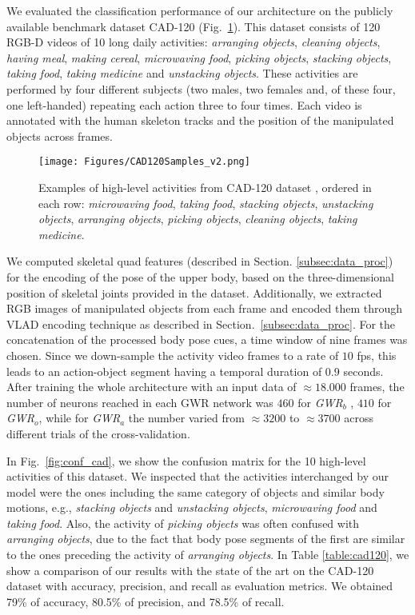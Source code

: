 \documentclass[5p,times]{elsarticle}
\begin{document}
We evaluated the classification performance of our architecture on the publicly available benchmark dataset CAD-120 (Fig.~\ref{fig:cad120}).
This dataset consists of 120 RGB-D videos of 10 long daily activities: \textit{arranging objects}, \textit{cleaning objects}, \textit{having meal}, \textit{making cereal}, \textit{microwaving food}, \textit{picking objects}, \textit{stacking objects}, \textit{taking food}, \textit{taking medicine} and \textit{unstacking objects}. These activities are performed by four different subjects (two males, two females and, of these four, one left-handed) repeating each action three to four times.  
Each video is annotated with the human skeleton tracks and the position of the manipulated objects across frames. 
\begin{figure}
\begin{center}
\texttt{[image: Figures/CAD120Samples\_v2.png]}
\caption{Examples of high-level activities from CAD-120 dataset \citep{koppula2013learning}, ordered in each row: \textit{microwaving food}, \textit{taking food}, \textit{stacking objects}, \textit{unstacking objects}, \textit{arranging objects}, \textit{picking objects}, \textit{cleaning objects}, \textit{taking medicine}.}
\label{fig:cad120}
\end{center}
\end{figure}

We computed skeletal quad features (described in Section. \ref{subsec:data_proc}) for the encoding of the pose of the upper body, based on the three-dimensional position of skeletal joints provided in the dataset.
Additionally, we extracted RGB images of manipulated objects from each frame and encoded them through VLAD encoding technique as described in Section.~\ref{subsec:data_proc}.
For the concatenation of the processed body pose cues, a time window of nine frames was chosen.
Since we down-sample the activity video frames to a rate of $10$ fps, this leads to an action-object segment having a temporal duration of $0.9$ seconds.
After training the whole architecture with an input data of $\approx18.000$ frames, the number of neurons reached in each GWR network was $460$ for \textit{GWR}$_b$ , $410$ for \textit{GWR}$_o$, while for \textit{GWR}$_a$ the number varied from $\approx3200$ to $\approx3700$ across different trials of the cross-validation.

In Fig.~\ref{fig:conf_cad}, we show the confusion matrix for the 10 high-level activities of this dataset. 
We inspected that the activities interchanged by our model were the ones including the same category of objects and similar body motions, e.g., \textit{stacking objects} and \textit{unstacking  objects}, \textit{microwaving food} and \textit{taking food}. 
Also, the activity of \textit{picking objects} was often confused with \textit{arranging objects}, due to the fact that body pose segments of the first are similar to the ones preceding the activity of \textit{arranging objects}.
In Table \ref{table:cad120}, we show a comparison of our results with the state of the art on the CAD-120 dataset with accuracy, precision, and recall as evaluation metrics.
We obtained 79\% of accuracy, 80.5\% of precision, and 78.5\% of recall.
\end{document}
